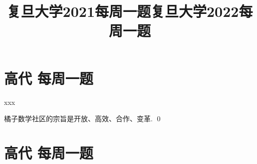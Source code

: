 \newtheorem*{remark}{\color{orange}{注}}

\title{复旦大学2021每周一题}
\maketitle

\section{高代 \uppercase\expandafter{} 每周一题}

\begin{groups}
    \begin{questions}
        \question xxx
    \end{questions}

    \begin{solution}{4cm}
        \method 橘子数学社区的宗旨是开放、高效、合作、变革.
        \qed
    \end{solution}
\end{groups}

\setcounter{Question}{0}

\title{复旦大学2022每周一题}
\maketitle

\section{高代 \uppercase\expandafter{} 每周一题}

